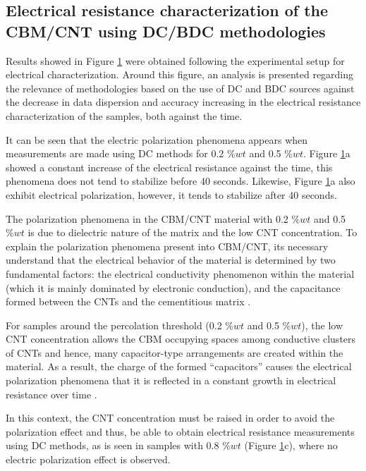 \documentclass[twocolumn]{bmcart}%
\begin{document}
\subsection{Electrical resistance characterization of the CBM/CNT using DC/BDC methodologies}

Results showed in Figure \ref{fig9} were obtained following the experimental setup for electrical characterization. Around this figure, an analysis is presented regarding the relevance of methodologies based on the use of DC and BDC sources against the decrease in data dispersion and accuracy increasing in the electrical resistance characterization of the samples, both against the time.

\begin{figure}[h!]
  \caption{
      }
      \label{fig9}
      \end{figure}

It can be seen that the electric polarization phenomena appears when measurements are made using DC methods for 0.2 $\%wt$  and 0.5 $\%wt$. Figure \ref{fig9}a showed a constant increase of the electrical resistance against the time, this phenomena does not tend to stabilize before 40 seconds. Likewise, Figure \ref{fig9}a also exhibit electrical polarization, however, it tends to stabilize after 40 seconds.

The polarization phenomena in the CBM/CNT material with 0.2 $\%wt$ and 0.5 $\%wt$ is due to dielectric nature of the matrix and the low CNT concentration. To explain the polarization phenomena present into CBM/CNT, its necessary understand that the electrical behavior of the  material is determined by two fundamental factors:  the electrical conductivity phenomenon within the material (which it is mainly dominated by electronic conduction), and the capacitance formed between the CNTs and the cementitious matrix \cite{Balberg1984}.

For samples around the percolation threshold (0.2 $\%wt$  and 0.5 $\%wt$), the low CNT concentration allows the CBM occupying spaces among conductive clusters of CNTs and hence, many capacitor-type arrangements are created within the material. As a result, the charge of the formed “capacitors”  causes the electrical polarization phenomena that it is reflected in a constant growth in electrical resistance over time \cite{Dong2016}.

In this context, the CNT concentration must be raised in order to avoid the polarization effect and thus, be able to obtain electrical resistance measurements using DC methods, as is seen in samples with 0.8 $\%wt$ (Figure \ref{fig9}c), where no electric polarization effect is observed.
\end{document}
